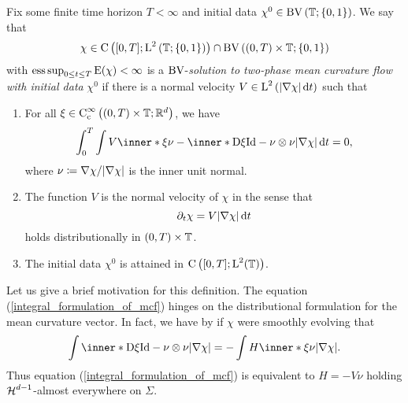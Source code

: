 \begin{definition}
	\label{motion_by_mcv}
	Fix some finite time horizon $ T < \infty $ and initial data $ \chi^{ 0 
	}\in \operatorname{BV} \left( \operatorname{\mathbb{T}} ; \{ 0 , 1 \} \right) $. We say that 
	\begin{equation*}
		\chi \in 
		\operatorname{C} \left(
		[ 0 , T ] ; \operatorname{L}^{ 2 } \left( \operatorname{\mathbb{T}} ; \{ 0 , 1 \}  \right)
		\right)
		\cap
		\operatorname{BV} \left(
			( 0 , T ) \times \operatorname{\mathbb{T}} ; \{ 0 , 1 \} 
		\right)
	\end{equation*}
	with $ \operatorname*{ess\,sup}_{ 0 \leq t \leq T } \operatorname{E} ( \chi ) < \infty $ is a
	$ \operatorname{BV} $-\emph{solution to two-phase mean curvature flow with initial data} 
	$ \chi^{ 0 } $ if there is a normal velocity
	$ V \in \operatorname{L}^{ 2 } \left( \abs{ \nabla \chi } \dd{ t } \right) $ such that 
	\begin{enumerate}
		\item 
		For all 
		$ \xi \in \operatorname{C}_{ \mathrm{ c } }^{ \infty } \left( ( 0 , T ) \times 
		\operatorname{\mathbb{T}} ; \mathbb{ R }^{ d } \right) $,
		we have
		\begin{equation}
			\label{integral_formulation_of_mcf}
			\int_{ 0 }^{ T }
			\int
			V \inner*{ \xi }{ \nu }
			- 
			\inner*{ \diff \xi }{ \mathrm{ Id } - \nu \otimes \nu }
			\abs{ \nabla \chi }
			\dd{ t }
			=
			0,
		\end{equation}
		where $ \nu \coloneqq \nabla \chi / \abs{ \nabla \chi } $ is the inner 
		unit normal.
		\item 
		The function $ V $ is the normal velocity of $ \chi $ in the sense that 
		\begin{equation*}
			\partial_{ t } \chi
			=
			V
			\abs{ \nabla \chi }
			\dd{ t }
		\end{equation*}
		holds distributionally in $ ( 0 , T ) \times \operatorname{\mathbb{T}} $.
		\item 
		The initial data $ \chi^{ 0 } $ is attained in $ \operatorname{C} \left( [ 0 , T ] 
		; \operatorname{L}^{  2 } ( \operatorname{\mathbb{T}} ) \right) $.
	\end{enumerate}
\end{definition}

Let us give a brief motivation for this definition. The equation 
(\ref{integral_formulation_of_mcf}) hinges on the distributional formulation 
for the mean curvature vector. In fact, we have by
\cite[Thm.~11.8]{maggi_sets_of_finite_perimeter} if $ \chi $ were smoothly 
evolving that
\begin{equation*}
	\int
		\inner*{ \diff \xi }{ \mathrm{Id} - \nu \otimes \nu }
	\abs{ \nabla \chi }
	=
	-
	\int
		H \inner*{ \xi }{ \nu }
	\abs{ \nabla \chi }.
\end{equation*}
Thus equation (\ref{integral_formulation_of_mcf}) is equivalent to $ H = -  V 
\nu $ holding
$ \operatorname{\mathcal{H}}^{ d-1 } $-almost everywhere on $ \Sigma $.

